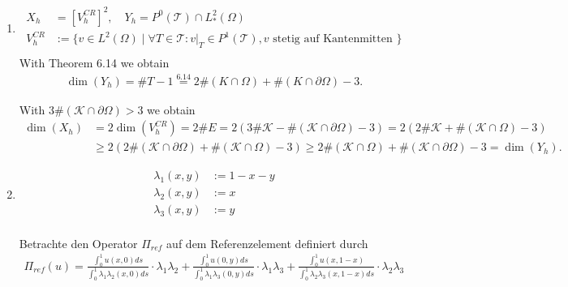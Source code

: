 
\begin{solution}

\phantom{}

\begin{enumerate}[label = \textbf{\alph*)}]
  \item
  \begin{align*}
    X_h &= [V_h^{CR}]^2, \quad Y_h = P^0(\mathcal{T}) \cap L^2_*(\Omega)\\
    V_h^{CR} &:= \{v \in L^2(\Omega) \mid \forall T \in \mathcal{T}: v|_T \in P^1(\mathcal{T}),
    v \text{ stetig auf Kantenmitten }\} \\
  \end{align*}
  With Theorem 6.14 we obtain
  \begin{align*}
  \dim(Y_h) = \# T - 1 \stackrel{6.14}{=} 2\#(K\cap \Omega) + \#(K \cap \partial\Omega) - 3.
  \end{align*}

  With $3\#(\mathcal{K} \cap \partial\Omega) > 3$ we obtain
  \begin{align*}
    \dim(X_h) &= 2\dim(V_h^{CR}) = 2\# E = 2(3\#\mathcal{K} - \#(\mathcal{K}\cap \partial\Omega) - 3)
    = 2(2\#\mathcal{K} + \#(\mathcal{K} \cap \Omega) - 3) \\
    &\geq 2(2\#(\mathcal{K} \cap \partial\Omega) + \#(\mathcal{K} \cap \Omega) - 3)
    \geq 2\#(\mathcal{K} \cap \Omega) + \#(\mathcal{K} \cap \partial\Omega) - 3 = \dim(Y_h).
  \end{align*}

  \item

  \begin{align*}
    \lambda_1(x,y) &:= 1 - x - y \\
    \lambda_2(x,y) &:= x \\
    \lambda_3(x,y) &:= y \\
  \end{align*}

  Betrachte den Operator $\Pi_{ref}$ auf dem Referenzelement definiert durch
  \begin{align*}
    \Pi_{ref}(u) = \frac{\int_0^1 u(x,0) ds}{\int_0^1 \lambda_1 \lambda_2(x,0) ds} \cdot \lambda_1 \lambda_2
    + \frac{\int_0^1 u(0,y) ds}{\int_0^1 \lambda_1 \lambda_3(0,y) ds} \cdot \lambda_1 \lambda_3
    + \frac{\int_0^1 u(x,1-x)}{\int_0^1 \lambda_2 \lambda_3(x,1-x) ds} \cdot \lambda_2 \lambda_3
  \end{align*}


\end{enumerate}
\end{solution}
